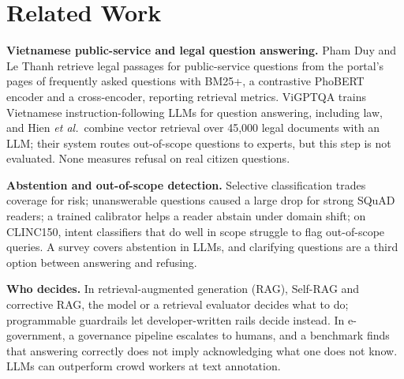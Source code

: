 \section{Related Work}

\textbf{Vietnamese public-service and legal question answering.} Pham Duy and Le Thanh retrieve legal passages for public-service questions
from the portal's pages of frequently asked questions with BM25+, a contrastive PhoBERT encoder and a cross-encoder, reporting retrieval metrics\cite{phamduy2023}. ViGPTQA trains Vietnamese instruction-following LLMs for question answering, including
law\cite{vigptqa2023}, and Hien \emph{et al.}\ combine vector retrieval over 45,000 legal documents with an LLM\cite{hien2025}; their system routes
out-of-scope questions to experts, but this step is not evaluated. None measures refusal on real citizen questions.

\textbf{Abstention and out-of-scope detection.} Selective classification trades coverage for risk\cite{geifman2017}; unanswerable questions
caused a large drop for strong SQuAD readers\cite{rajpurkar2018}; a trained calibrator helps a reader abstain under domain
shift\cite{kamath2020}; on CLINC150, intent classifiers that do well in scope struggle to flag out-of-scope queries\cite{larson2019}. A
survey covers abstention in LLMs\cite{wen2025}, and clarifying questions are a third option between answering and
refusing\cite{aliannejadi2019}.

\textbf{Who decides.} In retrieval-augmented generation (RAG)\cite{lewis2020}, Self-RAG and corrective RAG, the model or a retrieval evaluator
decides what to do\cite{asai2024,yan2024}; programmable guardrails let developer-written rails decide instead\cite{rebedea2023}. In
e-government, a governance pipeline escalates to humans\cite{kaplan2026}, and a benchmark finds that answering correctly does not
imply acknowledging what one does not know\cite{samson2026}. LLMs can outperform crowd workers at text annotation\cite{gilardi2023}.
